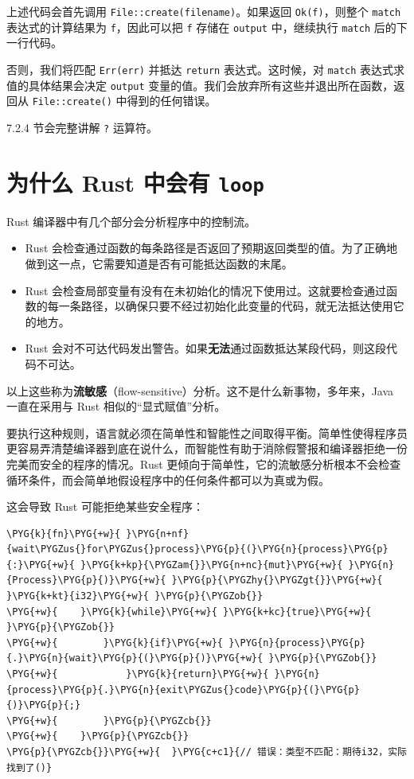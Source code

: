 上述代码会首先调用 \texttt{File::create(filename)}。如果返回 \texttt{Ok(f)}，则整个 \texttt{match} 表达式的计算结果为 \texttt{f}，因此可以把 \texttt{f} 存储在 \texttt{output} 中，继续执行 \texttt{match} 后的下一行代码。

否则，我们将匹配 \texttt{Err(err)} 并抵达 \texttt{return} 表达式。这时候，对 \texttt{match} 表达式求值的具体结果会决定 \texttt{output} 变量的值。我们会放弃所有这些并退出所在函数，返回从 \texttt{File::create()} 中得到的任何错误。

7.2.4 节会完整讲解 \texttt{?} 运算符。

\section{为什么 Rust 中会有 \texttt{loop}}

Rust 编译器中有几个部分会分析程序中的控制流。

\begin{itemize}
\item Rust 会检查通过函数的每条路径是否返回了预期返回类型的值。为了正确地做到这一点，它需要知道是否有可能抵达函数的末尾。
\item Rust 会检查局部变量有没有在未初始化的情况下使用过。这就要检查通过函数的每一条路径，以确保只要不经过初始化此变量的代码，就无法抵达使用它的地方。
\item Rust 会对不可达代码发出警告。如果\textbf{无法}通过函数抵达某段代码，则这段代码不可达。
\end{itemize}

以上这些称为\textbf{流敏感}（flow-sensitive）分析。这不是什么新事物，多年来，Java 一直在采用与 Rust 相似的“显式赋值”分析。

要执行这种规则，语言就必须在简单性和智能性之间取得平衡。简单性使得程序员更容易弄清楚编译器到底在说什么，而智能性有助于消除假警报和编译器拒绝一份完美而安全的程序的情况。Rust 更倾向于简单性，它的流敏感分析根本不会检查循环条件，而会简单地假设程序中的任何条件都可以为真或为假。

这会导致 Rust 可能拒绝某些安全程序：

\begin{Verbatim}[commandchars=\\\{\},breaklines=true,breakanywhere=true,fontsize=\codefont,xleftmargin=17bp]
\PYG{k}{fn}\PYG{+w}{ }\PYG{n+nf}{wait\PYGZus{}for\PYGZus{}process}\PYG{p}{(}\PYG{n}{process}\PYG{p}{:}\PYG{+w}{ }\PYG{k+kp}{\PYGZam{}}\PYG{n+nc}{mut}\PYG{+w}{ }\PYG{n}{Process}\PYG{p}{)}\PYG{+w}{ }\PYG{p}{\PYGZhy{}\PYGZgt{}}\PYG{+w}{ }\PYG{k+kt}{i32}\PYG{+w}{ }\PYG{p}{\PYGZob{}}
\PYG{+w}{    }\PYG{k}{while}\PYG{+w}{ }\PYG{k+kc}{true}\PYG{+w}{ }\PYG{p}{\PYGZob{}}
\PYG{+w}{        }\PYG{k}{if}\PYG{+w}{ }\PYG{n}{process}\PYG{p}{.}\PYG{n}{wait}\PYG{p}{(}\PYG{p}{)}\PYG{+w}{ }\PYG{p}{\PYGZob{}}
\PYG{+w}{            }\PYG{k}{return}\PYG{+w}{ }\PYG{n}{process}\PYG{p}{.}\PYG{n}{exit\PYGZus{}code}\PYG{p}{(}\PYG{p}{)}\PYG{p}{;}
\PYG{+w}{        }\PYG{p}{\PYGZcb{}}
\PYG{+w}{    }\PYG{p}{\PYGZcb{}}
\PYG{p}{\PYGZcb{}}\PYG{+w}{  }\PYG{c+c1}{// 错误：类型不匹配：期待i32，实际找到了()}
\end{Verbatim}


